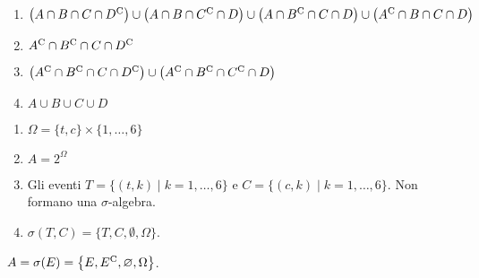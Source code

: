 \Soluzione

\begin{enumerate}
	\item $\left( A\cap B\cap C\cap D^{\mathrm{C}}\right) \cup \left( A\cap B\cap C^{\mathrm{C}} \cap D\right) \cup \left( A\cap B^{\mathrm{C}} \cap C\cap D\right) \cup \left( A^{\mathrm{C}} \cap B\cap C\cap D\right)$
	\item $A^{\mathrm{C}} \cap B^{\mathrm{C}} \cap C\cap D^{\mathrm{C}}$
	\item $\left( A^{\mathrm{C}} \cap B^{\mathrm{C}} \cap C\cap D^{\mathrm{C}}\right) \cup \left( A^{\mathrm{C}} \cap B^{\mathrm{C}} \cap C^{\mathrm{C}} \cap D\right)$
	\item $A\cup B\cup C\cup D$
\end{enumerate}

\Soluzione

\begin{enumerate}
	\item $\Omega =\{t,c\} \times \{1,\dots ,6\}$
	\item $A=2^{\Omega }$
	\item Gli eventi $T=\{( t,k) \mid k=1,\dots ,6\}$ e $C=\{( c,k) \mid k=1,\dots ,6\}$. Non formano una $\sigma $-algebra.
	\item $\sigma ( T,C) =\{T,C,\emptyset ,\Omega \}$.
\end{enumerate}

\Soluzione

$A=\sigma ( E) =\left\{E,E^{\mathrm{C}} ,\varnothing ,\Omega \right\}$.

\Soluzione

